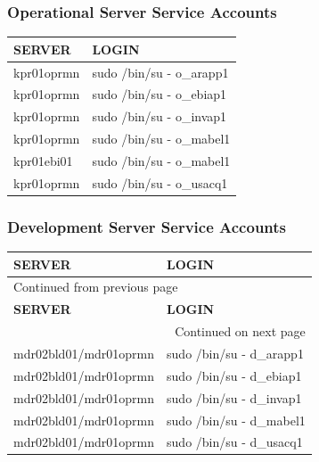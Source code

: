 \documentclass[12pt,twoside]{article}
\begin{document}
\subsubsection{Operational Server Service Accounts}
\label{sec:orgheadline10}
\footnotesize
\begin{center}
\begin{tabular}{ll}
\hline
\textbf{SERVER} & \textbf{LOGIN}\\
\hline
kpr01oprmn & sudo /bin/su - o\_arapp1\\
kpr01oprmn & sudo /bin/su - o\_ebiap1\\
kpr01oprmn & sudo /bin/su - o\_invap1\\
kpr01oprmn & sudo /bin/su - o\_mabel1\\
kpr01ebi01 & sudo /bin/su - o\_mabel1\\
kpr01oprmn & sudo /bin/su - o\_usacq1\\
\hline
\end{tabular}
\end{center}

\normalsize
\subsubsection{Development Server Service Accounts}
\label{sec:orgheadline11}
\footnotesize
\begin{longtable}{l|l}
\hline
\textbf{SERVER} & \textbf{LOGIN}\\
\hline
\endfirsthead
\multicolumn{2}{l}{Continued from previous page} \\
\hline

\textbf{SERVER} & \textbf{LOGIN} \\

\hline
\endhead
\hline\multicolumn{2}{r}{Continued on next page} \\
\endfoot
\endlastfoot
\hline
mdr02bld01/mdr01oprmn & sudo /bin/su - d\_arapp1\\
mdr02bld01/mdr01oprmn & sudo /bin/su - d\_ebiap1\\
mdr02bld01/mdr01oprmn & sudo /bin/su - d\_invap1\\
mdr02bld01/mdr01oprmn & sudo /bin/su - d\_mabel1\\
mdr02bld01/mdr01oprmn & sudo /bin/su - d\_usacq1\\
\hline
\end{longtable}

\normalsize
\end{document}
